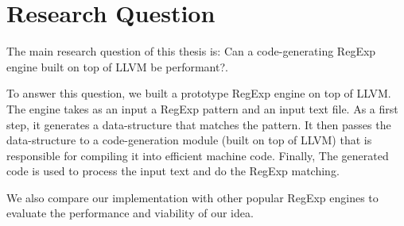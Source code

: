 \section{Research Question}\label{researchq}

The main research question of this thesis is: Can a code-generating RegExp engine built on top of LLVM be performant?.

To answer this question, we built a prototype RegExp engine on top of LLVM. The engine takes as an input a RegExp pattern and an input text file. As a first step, it generates a data-structure that matches the pattern. It then passes the data-structure to a code-generation module (built on top of LLVM) that is responsible for compiling it into efficient machine code. Finally, The generated code is used to process the input text and do the RegExp matching.

We also compare our implementation with other popular RegExp engines to evaluate the performance and viability of our idea. 